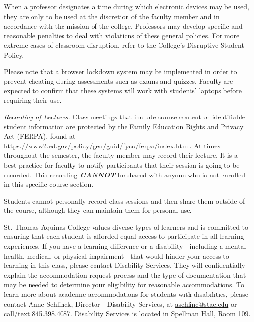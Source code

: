 \documentclass[11pt,letterpaper]{article}
\begin{document}
When a professor designates a time during which electronic devices may be used, they are only to be used at the discretion of the faculty member and in accordance with the mission of the college. Professors may develop specific and reasonable penalties to deal with violations of these general policies. For more extreme cases of classroom disruption, refer to the College's Disruptive Student Policy. \pspace

Please note that a browser lockdown system may be implemented in order to prevent cheating during assessments such as exams and quizzes. Faculty are expected to confirm that these systems will work with students' laptops before requiring their use. \pspace


{\itshape Recording of Lectures:} Class meetings that include course content or identifiable student information are protected by the Family Education Rights and Privacy Act (FERPA), found at \url{https://www2.ed.gov/policy/gen/guid/fpco/ferpa/index.html}. At times throughout the semester, the faculty member may record their lecture. It is a best practice for faculty to notify participants that their session is going to be recorded. This recording \textit{\textbf{CANNOT}} be shared with anyone who is not enrolled in this specific course section. \pspace

Students cannot personally record class sessions and then share them outside of the course, although they can maintain them for personal use.
\sectionbreak




St. Thomas Aquinas College values diverse types of learners and is committed to ensuring that each student is afforded equal access to participate in all learning experiences. If you have a learning difference or a disability---including a mental health, medical, or physical impairment---that would hinder your access to learning in this class, please contact Disability Services. They will confidentially explain the accommodation request process and the type of documentation that may be needed to determine your eligibility for reasonable accommodations. To learn more about academic accommodations for students with disabilities, please contact Anne Schlinck, Director---Disability Services, at \href{mailto:aschlinc@stac.edu}{aschlinc@stac.edu} or call/text 845.398.4087. Disability Services is located in Spellman Hall, Room 109. \pspace
\end{document}
